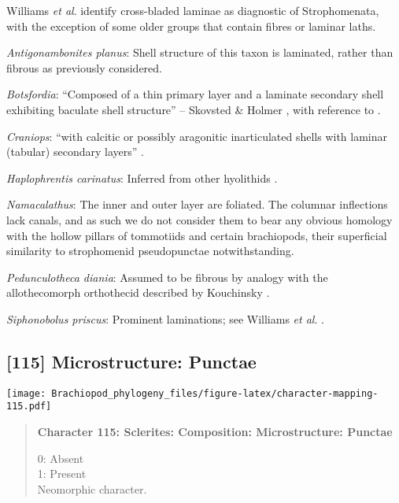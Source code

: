 \documentclass[openany]{book}
\theoremstyle{definition}
\theoremstyle{definition}
\theoremstyle{definition}
\theoremstyle{remark}
\begin{document}
Williams \emph{et al}.
\citeyearpar{Williams2000LinguliformeaCraniiformea} identify
cross-bladed laminae as diagnostic of Strophomenata, with the exception
of some older groups that contain fibres or laminar laths.

\hypertarget{Antigonambonites_planus-coding-114}{}
\emph{Antigonambonites planus}: Shell structure of this taxon is
laminated, rather than fibrous as previously considered.

\hypertarget{Botsfordia-coding-114}{}
\emph{Botsfordia}: ``Composed of a thin primary layer and a laminate
secondary shell exhibiting baculate shell structure'' -- Skovsted \&
Holmer \citeyearpar{Skovsted2005EarlyCambrian}, with reference to
\citet{Skovsted2003EarlyCambrian}.

\hypertarget{Craniops-coding-114}{}
\emph{Craniops}: ``with calcitic or possibly aragonitic inarticulated
shells with laminar (tabular) secondary layers''
\citep{Williams2000LinguliformeaCraniiformea}.

\hypertarget{Haplophrentis_carinatus-coding-114}{}
\emph{Haplophrentis carinatus}: Inferred from other hyolithids
\citep[e.g.][]{Moore2018Plywoodlike}.

\hypertarget{Namacalathus-coding-114}{}
\emph{Namacalathus}: The inner and outer layer are foliated. The
columnar inflections lack canals, and as such we do not consider them to
bear any obvious homology with the hollow pillars of tommotiids and
certain brachiopods, their superficial similarity to strophomenid
pseudopunctae notwithstanding.

\hypertarget{Pedunculotheca_diania-coding-114}{}
\emph{Pedunculotheca diania}: Assumed to be fibrous by analogy with the
allothecomorph orthothecid described by Kouchinsky
\citeyearpar{Kouchinsky2000Skeletalmicrostructures}.

\hypertarget{Siphonobolus_priscus-coding-114}{}
\emph{Siphonobolus priscus}: Prominent laminations; see Williams
\emph{et al}. \citeyearpar{Williams2004Chemicostructure}.

\subsection*{{[}115{]} Microstructure:
Punctae}\label{microstructure-punctae}

\texttt{[image: Brachiopod\_phylogeny\_files/figure-latex/character-mapping-115.pdf]}

\begin{quote}
\textbf{Character 115: Sclerites: Composition: Microstructure: Punctae}

0: Absent\\
1: Present\\
Neomorphic character.
\end{quote}
\end{document}
